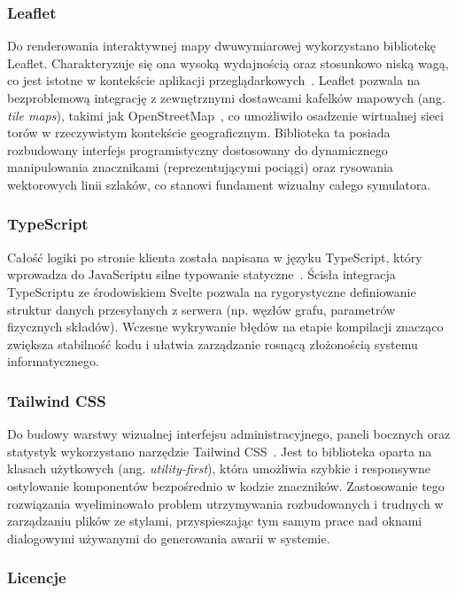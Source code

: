 \documentclass[twoside]{projektInzynierskiMS1z}
\begin{document}
\subsubsection{Leaflet}

Do renderowania interaktywnej mapy dwuwymiarowej wykorzystano bibliotekę Leaflet.
Charakteryzuje się ona wysoką wydajnością oraz stosunkowo niską wagą, co jest istotne
w kontekście aplikacji przeglądarkowych~\cite{leaflet}. Leaflet pozwala na
bezproblemową integrację z zewnętrznymi dostawcami kafelków mapowych (ang. \emph{tile
maps}), takimi jak OpenStreetMap~\cite{openstreetmap}, co umożliwiło osadzenie wirtualnej
sieci torów w rzeczywistym kontekście geograficznym. Biblioteka ta posiada rozbudowany
interfejs programistyczny dostosowany do dynamicznego manipulowania znacznikami
(reprezentującymi pociągi) oraz rysowania wektorowych linii szlaków, co stanowi
fundament wizualny całego symulatora.

\subsubsection{TypeScript}

Całość logiki po stronie klienta została napisana w języku TypeScript, który wprowadza
do JavaScriptu silne typowanie statyczne~\cite{typescript}. Ścisła integracja
TypeScriptu ze środowiskiem Svelte pozwala na rygorystyczne definiowanie struktur
danych przesyłanych z serwera (np. węzłów grafu, parametrów fizycznych składów).
Wczesne wykrywanie błędów na etapie kompilacji znacząco zwiększa stabilność kodu
i ułatwia zarządzanie rosnącą złożonością systemu informatycznego.

\subsubsection{Tailwind CSS}

Do budowy warstwy wizualnej interfejsu administracyjnego, paneli bocznych oraz
statystyk wykorzystano narzędzie Tailwind CSS~\cite{tailwind}. Jest to biblioteka
oparta na klasach użytkowych (ang. \emph{utility-first}), która umożliwia szybkie
i responsywne ostylowanie komponentów bezpośrednio w kodzie znaczników. Zastosowanie
tego rozwiązania wyeliminowało problem utrzymywania rozbudowanych i trudnych
w zarządzaniu plików ze stylami, przyspieszając tym samym prace nad oknami dialogowymi
używanymi do generowania awarii w systemie.

\subsubsection{Licencje}
\end{document}

